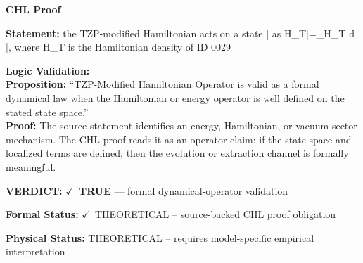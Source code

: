 \vspace{0.45em}
\noindent\textbf{CHL Proof}\par
\textbf{Statement:} the TZP-modified Hamiltonian acts on a state | as H\_T|=\_H\_T d |, where H\_T is the
Hamiltonian density of ID 0029

\textbf{Logic Validation:}\\
\textbf{Proposition:} ``TZP-Modified Hamiltonian Operator is valid as a formal dynamical law when the
Hamiltonian or energy operator is well defined on the stated state space.''\\
\textbf{Proof:} The source statement identifies an energy, Hamiltonian, or vacuum-sector mechanism. The
CHL proof reads it as an operator claim: if the state space and localized terms are
defined, then the evolution or extraction channel is formally meaningful.

\textbf{VERDICT:} \ensuremath{\checkmark}\ \textbf{TRUE} --- formal dynamical-operator validation

\textbf{Formal Status:} \ensuremath{\checkmark}\ THEORETICAL -- source-backed CHL proof obligation

\textbf{Physical Status:} THEORETICAL -- requires model-specific empirical interpretation
\par\vspace{0.45em}
\par
\ifTZPDarkEdition
{}
\fi
\endgroup
\endgroup

